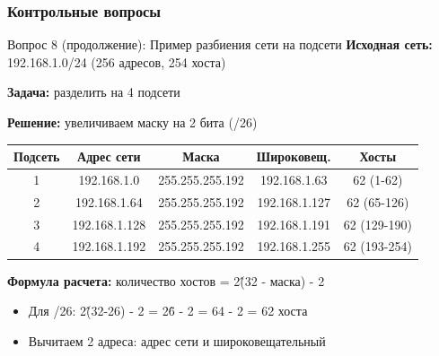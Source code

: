 \begin{frame}
\frametitle{Контрольные вопросы}
\begin{block}{Вопрос 8 (продолжение): Пример разбиения сети на подсети}
\textbf{Исходная сеть:} 192.168.1.0/24 (256 адресов, 254 хоста)

\textbf{Задача:} разделить на 4 подсети

\textbf{Решение:} увеличиваем маску на 2 бита (/26)

\begin{table}[h]
\centering
\begin{tabular}{|c|c|c|c|c|}
\hline
\textbf{Подсеть} & \textbf{Адрес сети} & \textbf{Маска} & \textbf{Широковещ.} & \textbf{Хосты} \\
\hline
1 & 192.168.1.0 & 255.255.255.192 & 192.168.1.63 & 62 (1-62) \\
2 & 192.168.1.64 & 255.255.255.192 & 192.168.1.127 & 62 (65-126) \\
3 & 192.168.1.128 & 255.255.255.192 & 192.168.1.191 & 62 (129-190) \\
4 & 192.168.1.192 & 255.255.255.192 & 192.168.1.255 & 62 (193-254) \\
\hline
\end{tabular}
\end{table}

\textbf{Формула расчета:} количество хостов = 2\^(32 - маска) - 2
\begin{itemize}
    \item Для /26: 2\^(32-26) - 2 = 2\^6 - 2 = 64 - 2 = 62 хоста
    \item Вычитаем 2 адреса: адрес сети и широковещательный
\end{itemize}
\end{block}
\end{frame}

